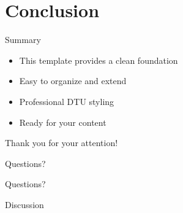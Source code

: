 
\section{Conclusion}

\begin{frame}{Summary}
    \begin{itemize}
        \item This template provides a clean foundation
        \item Easy to organize and extend
        \item Professional DTU styling
        \item Ready for your content
    \end{itemize}

    \vspace{2em}

    \centering
    \Large Thank you for your attention!
\end{frame}

\begin{frame}{Questions?}
    \centering
    \vspace{3em}

    {\Huge Questions?}

    \vspace{2em}

    {\large Discussion}
\end{frame}
